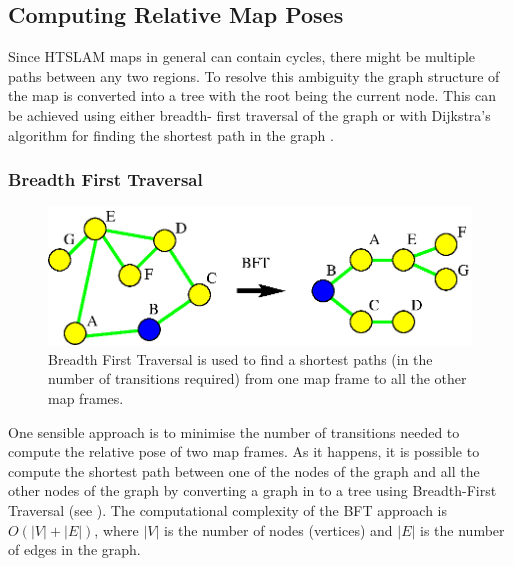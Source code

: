 



\subsection{Computing Relative Map Poses}
\label{sec:relative_poses}

Since HTSLAM maps in general can contain cycles, there might be
multiple paths between any two regions. To resolve this ambiguity the
graph structure of the map is converted into a tree with the root
being the current node. This can be achieved using either breadth-
first traversal of the graph or with Dijkstra's algorithm for finding
the shortest path in the graph \cite{dijkstra_shortest_path}.

\subsubsection{Breadth First Traversal}

\begin{figure}
\begin{center}
\includegraphics[width=12cm]{Pics/fig_bft}
\end{center}
\caption{Breadth First Traversal is used to find a shortest paths (in
the number of transitions required) from one map frame to all the
other map frames.}
\label{fig:bst}
\end{figure}

One sensible approach is to minimise the number of transitions needed
to compute the relative pose of two map frames. As it happens, it
is possible to compute the shortest path between one of the nodes of
the graph and all the other nodes of the graph by converting a graph
in to a tree using Breadth-First Traversal (see ).
The computational complexity of the BFT approach is $O(|V| + |E|)$,
where $|V|$ is the number of nodes (vertices) and $|E|$ is the number of
edges in the graph.


